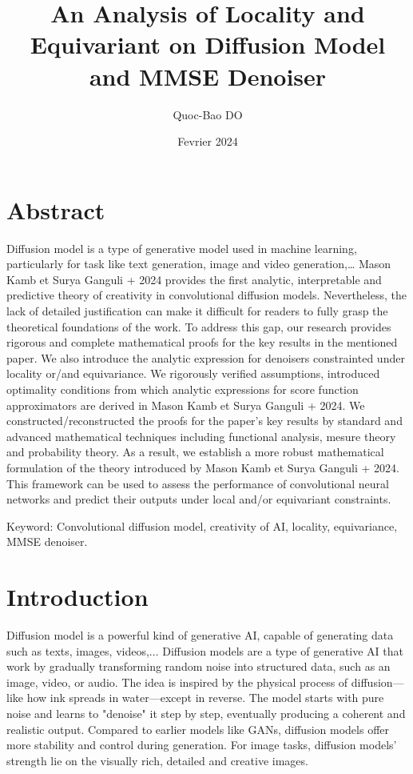 \documentclass[a4paper,10pt]{article}
\title{An Analysis of Locality and Equivariant on Diffusion Model and MMSE Denoiser}
\author{Quoc-Bao DO}
\date{Fevrier 2024}
\theoremstyle{definition} %
\theoremstyle{definition} %
\theoremstyle{definition} %
\theoremstyle{definition} %
\begin{document}
\maketitle



\section*{Abstract}
Diffusion model is a type of generative model used in machine learning, particularly for task like text generation, image and video generation,… Mason Kamb et Surya Ganguli + 2024 provides the first analytic, interpretable and predictive theory of creativity in convolutional diffusion models. Nevertheless, the lack of detailed justification can make it difficult for readers to fully grasp the theoretical foundations of the work. To address this gap, our research provides rigorous and complete mathematical proofs for the key results in the mentioned paper. We also introduce the analytic expression for denoisers constrainted under locality or/and equivariance. We rigorously verified assumptions, introduced optimality conditions from which analytic expressions for score function approximators are derived in Mason Kamb et Surya Ganguli + 2024. We constructed/reconstructed the proofs for the paper’s key results by standard and advanced mathematical techniques including functional analysis, mesure theory and probability theory. As a result, we establish a more robust mathematical formulation of the theory introduced by Mason Kamb et Surya Ganguli + 2024. This framework can be used to assess the performance of convolutional neural networks and predict their outputs under local and/or equivariant constraints.

Keyword: Convolutional diffusion model, creativity of AI, locality, equivariance, MMSE denoiser.

\section{Introduction}
Diffusion model is a powerful kind of generative AI, capable of generating data such as texts, images, videos,... Diffusion models are a type of generative AI that work by gradually transforming random noise into structured data, such as an image, video, or audio. The idea is inspired by the physical process of diffusion—like how ink spreads in water—except in reverse. The model starts with pure noise and learns to "denoise" it step by step, eventually producing a coherent and realistic output. Compared to earlier models like GANs, diffusion models offer more stability and control during generation.  For image tasks, diffusion models’ strength lie on the visually rich, detailed and creative images. 
\end{document}
